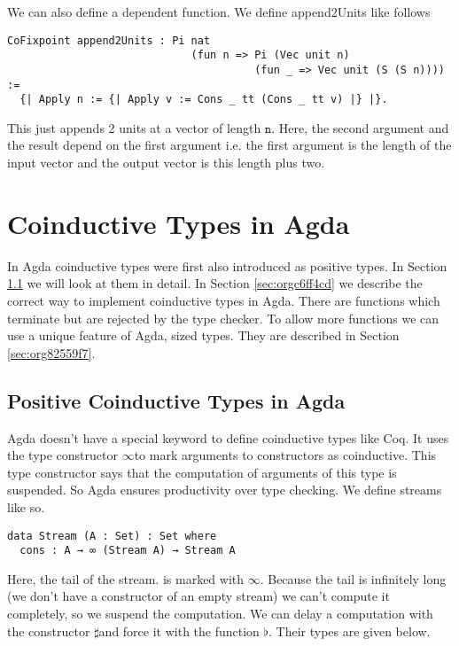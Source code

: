 \documentclass[a4paper,cleardoubleempty,BCOR1cm]{scrbook}
\begin{document}
We can also define a dependent function.  We define append2Units like
follows
\begin{verbatim}
CoFixpoint append2Units : Pi nat
                             (fun n => Pi (Vec unit n)
                                       (fun _ => Vec unit (S (S n)))) :=
  {| Apply n := {| Apply v := Cons _ tt (Cons _ tt v) |} |}.
\end{verbatim}
This just appends 2 units at a vector of length $\mathtt{n}$.  Here, the second
argument and the result depend on the first argument i.e. the first argument
is the length of the input vector and the output vector is this length plus
two.

\section{Coinductive Types in Agda}
\label{sec:org3231df2}
In Agda coinductive types were first also introduced as positive types. In
Section \ref{sec:org0f28a39} we will look at them in
detail. In Section \ref{sec:orgc6ff4cd} we describe the correct
way to implement coinductive types in Agda. There are functions which
terminate but are rejected by the type checker. To allow more functions we
can use a unique feature of Agda, sized types. They are described in Section
\ref{sec:org82559f7}.

\subsection{Positive Coinductive Types in Agda}
\label{sec:org0f28a39}
Agda doesn't have a special keyword to define coinductive types like Coq.  It
uses the type constructor $\mathtt{\infty}$\;to mark arguments to constructors as coinductive.
This type constructor says that the computation of arguments of this type is suspended.
So Agda ensures productivity over type checking. We define streams like so.

\begin{verbatim}
data Stream (A : Set) : Set where
  cons : A → ∞ (Stream A) → Stream A
\end{verbatim}

Here, the tail of the stream. is marked with $\mathtt{\infty}$. Because the tail is
infinitely long (we don't have a constructor of an empty stream) we can't
compute it completely, so we suspend the computation. We can delay a
computation with the constructor $\mathtt{\sharp}$\;and force it with the function
$\mathtt{\flat}$. Their types are given below.
\end{document}
